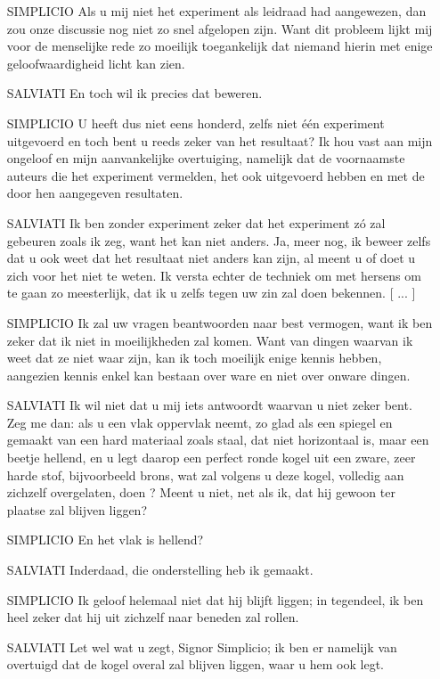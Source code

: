 \documentclass{ximera}
\begin{document}
{\begin{enumerate}
	\item[SIMPLICIO]Als u mij niet het experiment als leidraad had aangewezen, dan zou onze discussie nog niet zo snel afgelopen zijn. Want dit probleem lijkt mij voor de menselijke rede zo moeilijk toegankelijk dat niemand hierin met enige geloofwaardigheid licht kan zien. 
	\item[SALVIATI]En toch wil ik precies dat beweren.
	\item[SIMPLICIO]U heeft dus niet eens honderd, zelfs niet \'e\'en experiment uitgevoerd en toch bent u reeds zeker van het resultaat? Ik hou vast aan mijn ongeloof en mijn aanvankelijke overtuiging, namelijk dat de voornaamste auteurs die het experiment vermelden, het ook uitgevoerd hebben en met de door hen aangegeven resultaten.
	\item[SALVIATI]Ik ben zonder experiment zeker dat het experiment z\'o zal gebeuren zoals ik zeg, want het kan niet anders. Ja, meer nog, ik beweer zelfs dat u ook weet dat het resultaat niet anders kan zijn, al meent u of doet u zich voor het niet te weten. Ik versta echter de techniek om met hersens om te gaan zo meesterlijk, dat ik u zelfs tegen uw zin zal doen bekennen. [ ... ]
	\item[SIMPLICIO]Ik zal uw vragen beantwoorden naar best vermogen, want ik ben zeker dat ik niet in moeilijkheden zal komen. Want van dingen waarvan ik weet dat ze niet waar zijn, kan ik toch moeilijk enige kennis hebben, aangezien kennis enkel kan bestaan over ware en niet over onware dingen.
	\item[SALVIATI]Ik wil niet dat u mij iets antwoordt waarvan u niet zeker bent. Zeg me dan: als u een vlak oppervlak neemt, zo glad als een spiegel en gemaakt van een hard materiaal zoals staal, dat niet horizontaal is, maar een beetje hellend, en u legt daarop een perfect ronde kogel uit een zware, zeer harde stof, bijvoorbeeld brons, wat zal volgens u deze kogel, volledig aan zichzelf overgelaten, doen ? Meent u niet, net als ik, dat hij gewoon ter plaatse zal blijven liggen?
	\item[SIMPLICIO]En het vlak is hellend?
	\item[SALVIATI]Inderdaad, die onderstelling heb ik gemaakt. 
	\item[SIMPLICIO]Ik geloof helemaal niet dat hij blijft liggen; in tegendeel, ik ben heel zeker dat hij uit zichzelf naar beneden zal rollen.
	\item[SALVIATI]Let wel wat u zegt, Signor Simplicio; ik ben er namelijk van overtuigd dat de kogel overal zal blijven liggen, waar u hem ook legt.

\end{enumerate}}
\end{document}
